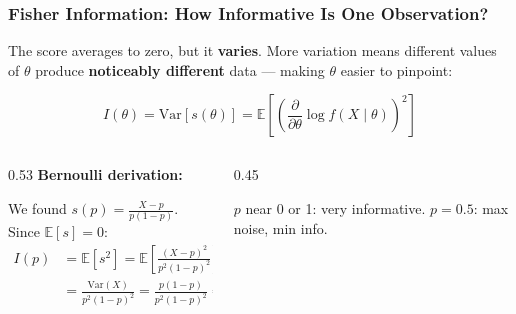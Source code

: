 \documentclass[aspectratio=169]{beamer}
\begin{document}
\begin{frame}
\frametitle{Fisher Information: How Informative Is One Observation?}

The score averages to zero, but it \textbf{varies}. More variation means different values of $\theta$ produce \textbf{noticeably different} data --- making $\theta$ easier to pinpoint:

\vspace{-0.15cm}
$$\boxed{I(\theta) = \text{Var}[s(\theta)] = \mathbb{E}\!\left[\left(\frac{\partial}{\partial\theta}\log f(X \mid \theta)\right)^{\!2}\right]}$$

\pause
\vspace{-0.2cm}
\begin{columns}[T]
\begin{column}{0.53\textwidth}
\small
\vspace{0.2cm}
\textbf{Bernoulli derivation:}

\vspace{0.05cm}
We found $s(p) = \frac{X - p}{p(1-p)}$. Since $\mathbb{E}[s] = 0$:
\vspace{-0.1cm}
\begin{align*}
I(p) &= \mathbb{E}[s^2] = \mathbb{E}\!\left[\frac{(X-p)^2}{p^2(1{-}p)^2}\right]\\[2pt]
  &= \frac{\text{Var}(X)}{p^2(1{-}p)^2} = \frac{p(1{-}p)}{p^2(1{-}p)^2} = \boxed{\frac{1}{p(1{-}p)}}
\end{align*}
\end{column}
\begin{column}{0.45\textwidth}
\begin{center}
\end{center}
\scriptsize\centering $p$ near 0 or 1: very informative. $p = 0.5$: max noise, min info.
\end{column}
\end{columns}
\end{frame}
\end{document}
